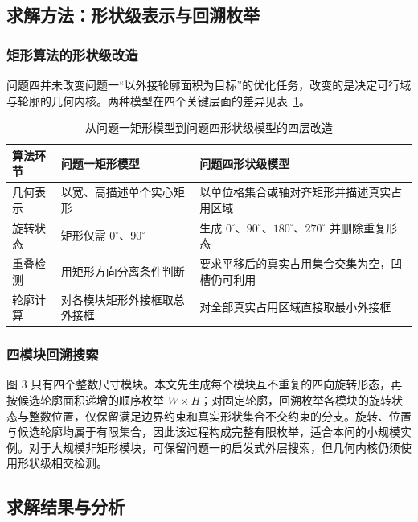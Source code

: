 \subsection{求解方法：形状级表示与回溯枚举}

\subsubsection{矩形算法的形状级改造}

问题四并未改变问题一“以外接轮廓面积为目标”的优化任务，改变的是决定可行域与轮廓的几何内核。两种模型在四个关键层面的差异见表~\ref{tab:q4_algorithm_changes}。

\begin{table}[H]
  \centering
  \caption{从问题一矩形模型到问题四形状级模型的四层改造}
  \label{tab:q4_algorithm_changes}
  \small
  \renewcommand{\arraystretch}{1.15}
  \begin{tabular}{p{2.3cm} p{4.2cm} p{6.0cm}}
    \toprule
    算法环节 & 问题一矩形模型 & 问题四形状级模型 \\
    \midrule
    几何表示 & 以宽、高描述单个实心矩形 & 以单位格集合或轴对齐矩形并描述真实占用区域 \\
    旋转状态 & 矩形仅需 $0^\circ$、$90^\circ$ & 生成 $0^\circ$、$90^\circ$、$180^\circ$、$270^\circ$ 并删除重复形态 \\
    重叠检测 & 用矩形方向分离条件判断 & 要求平移后的真实占用集合交集为空，凹槽仍可利用 \\
    轮廓计算 & 对各模块矩形外接框取总外接框 & 对全部真实占用区域直接取最小外接框 \\
    \bottomrule
  \end{tabular}
\end{table}

\subsubsection{四模块回溯搜索}

图 3 只有四个整数尺寸模块。本文先生成每个模块互不重复的四向旋转形态，再按候选轮廓面积递增的顺序枚举 $W\times H$；对固定轮廓，回溯枚举各模块的旋转状态与整数位置，仅保留满足边界约束和真实形状集合不交约束的分支。旋转、位置与候选轮廓均属于有限集合，因此该过程构成完整有限枚举，适合本问的小规模实例。对于大规模非矩形模块，可保留问题一的启发式外层搜索，但几何内核仍须使用形状级相交检测。

\subsection{求解结果与分析}

